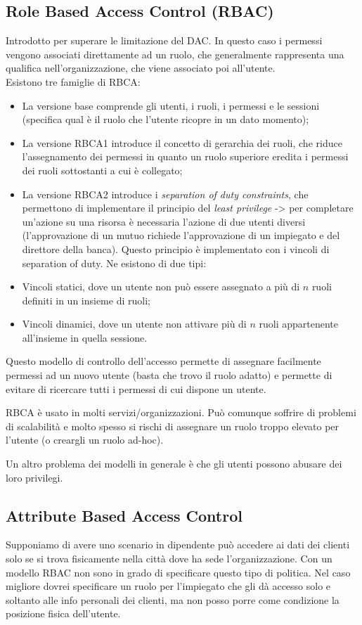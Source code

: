 \subsection{Role Based Access Control (RBAC)}
Introdotto per superare le limitazione del DAC. In questo caso i permessi vengono associati direttamente ad un ruolo, che generalmente rappresenta una qualifica nell'organizzazione, che viene associato poi all'utente.
\\

\noindent Esistono tre famiglie di RBCA:
\begin{itemize}
    \item La versione base comprende gli utenti, i ruoli, i permessi e le sessioni (specifica qual è il ruolo che l'utente ricopre in un dato momento);
    \item La versione RBCA1 introduce il concetto di gerarchia dei ruoli, che riduce l'assegnamento dei permessi in quanto un ruolo superiore eredita i permessi dei ruoli sottostanti a cui è collegato;
    \item La versione RBCA2 introduce i \textit{separation of duty constraints}, che permettono di implementare il principio del \textit{least privilege} -> per completare un'azione su una risorsa è necessaria l'azione di due utenti diversi (l'approvazione di un mutuo richiede l'approvazione di un impiegato e del direttore della banca). Questo principio è implementato con i vincoli di separation of duty. Ne esistono di due tipi:
    	\item Vincoli statici, dove un utente non può essere assegnato a più di $n$ ruoli definiti in un insieme di ruoli;
    	\item Vincoli dinamici, dove un utente non attivare più di $n$ ruoli appartenente all'insieme in quella sessione.
\end{itemize}

\noindent Questo modello di controllo dell'accesso permette di assegnare facilmente permessi ad un nuovo utente (basta che trovo il ruolo adatto) e permette di evitare di ricercare tutti i permessi di cui dispone un utente. 

RBCA è usato in molti servizi/organizzazioni. Può comunque soffrire di problemi di scalabilità e molto spesso si rischi di assegnare un ruolo troppo elevato per l'utente (o creargli un ruolo ad-hoc).

Un altro problema dei modelli in generale è che gli utenti possono abusare dei loro privilegi.

\subsection{Attribute Based Access Control}
Supponiamo di avere uno scenario in dipendente può accedere ai dati dei clienti solo se si trova fisicamente nella città dove ha sede l'organizzazione. Con un modello RBAC non sono in grado di specificare questo tipo di politica. Nel caso migliore dovrei specificare un ruolo per l'impiegato che gli dà accesso solo e soltanto alle info personali dei clienti, ma non posso porre come condizione la posizione fisica dell'utente.

